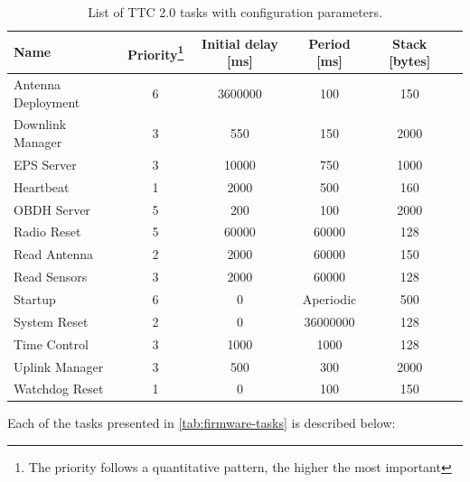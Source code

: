 \begin{table}[!ht]
    \centering

    \begin{tabular}{lccccc}
        \toprule[1.5pt]
        \textbf{Name}          & \textbf{Priority\footnote{The priority follows a quantitative pattern, the higher the most important}} & \textbf{Initial delay [ms]} & \textbf{Period [ms]} & \textbf{Stack [bytes]} \\
        \midrule
        Antenna Deployment     & 6  & 3600000 & 100       & 150  \\
        Downlink Manager       & 3  & 550     & 150       & 2000 \\
        EPS Server             & 3  & 10000   & 750       & 1000 \\
        Heartbeat              & 1  & 2000    & 500       & 160  \\
        OBDH Server            & 5  & 200     & 100       & 2000 \\
        Radio Reset            & 5  & 60000   & 60000     & 128  \\
        Read Antenna           & 2  & 2000    & 60000     & 150  \\
        Read Sensors           & 3  & 2000    & 60000     & 128  \\
        Startup                & 6  & 0       & Aperiodic & 500  \\
        System Reset           & 2  & 0       & 36000000  & 128  \\
        Time Control           & 3  & 1000    & 1000      & 128  \\
        Uplink Manager         & 3  & 500     & 300       & 2000 \\
        Watchdog Reset         & 1  & 0       & 100       & 150  \\
        \bottomrule[1.5pt]
    \end{tabular}
    \caption{List of TTC 2.0 tasks with configuration parameters.}
    \label{tab:firmware-tasks}
\end{table}

Each of the tasks presented in \autoref{tab:firmware-tasks} is described below:

